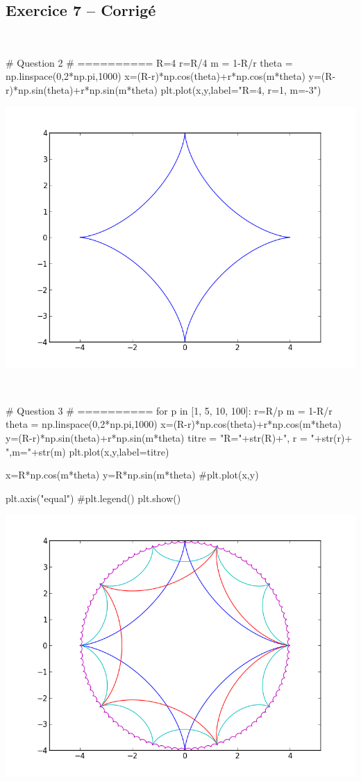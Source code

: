 \documentclass[10pt,fleqn]{article} %
\begin{document}
{}
\subsection*{Exercice 7 -- Corrigé}

\begin{corrige}
$\quad$
\begin{python}
# Question 2
# ==========
R=4
r=R/4
m = 1-R/r
theta = np.linspace(0,2*np.pi,1000)
x=(R-r)*np.cos(theta)+r*np.cos(m*theta)
y=(R-r)*np.sin(theta)+r*np.sin(m*theta)
plt.plot(x,y,label="R=4, r=1, m=-3")
\end{python}
\end{corrige}

\begin{center}
\includegraphics[width=.4\linewidth]{images/exo_FB_07_1}
\end{center}

\begin{corrige}
$\quad$
\begin{python}
# Question 3
# ==========
for p in [1, 5, 10, 100]:
    r=R/p
    m = 1-R/r
    theta = np.linspace(0,2*np.pi,1000)
    x=(R-r)*np.cos(theta)+r*np.cos(m*theta)
    y=(R-r)*np.sin(theta)+r*np.sin(m*theta)
    titre = "R="+str(R)+", r = "+str(r)+ ",m="+str(m)
    plt.plot(x,y,label=titre)

x=R*np.cos(m*theta)
y=R*np.sin(m*theta)
#plt.plot(x,y)

plt.axis("equal")
#plt.legend()
plt.show()
\end{python}
\end{corrige}

\begin{center}
\includegraphics[width=.4\linewidth]{images/exo_FB_07_2}
\end{center}
\end{document}
